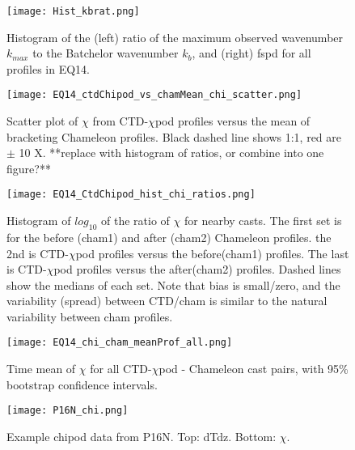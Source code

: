 \documentclass{ametsoc}
\begin{document}
\begin{figure}[t]
  \noindent\texttt{[image: Hist\_kbrat.png]}\\
  \caption{Histogram of the (left) ratio of the maximum observed wavenumber $k_{max}$ to the Batchelor wavenumber $k_b$, and (right) fspd for all profiles in EQ14. }
  \label{histkbrat}
\end{figure}

\begin{figure}[t]
  \noindent\texttt{[image: EQ14\_ctdChipod\_vs\_chamMean\_chi\_scatter.png]}\\
  \caption{Scatter plot of $\chi$ from CTD-$\chi$pod profiles versus the mean of bracketing Chameleon profiles. Black dashed line shows 1:1, red are $\pm$ 10 X. **replace with histogram of ratios, or combine into one figure?**}
  \label{eq14_cdtChi_vs_cham}
\end{figure}

\begin{figure}[t]
  \noindent\texttt{[image: EQ14\_CtdChipod\_hist\_chi\_ratios.png]}\\
  \caption{Histogram of $log_{10}$ of the ratio of $\chi$ for nearby casts. The first set is for the before (cham1) and after (cham2) Chameleon profiles. the 2nd is CTD-$\chi$pod profiles versus the before(cham1) profiles. The last is CTD-$\chi$pod profiles versus the after(cham2) profiles. Dashed lines show the medians of each set.  Note that bias is small/zero, and the variability (spread) between CTD/cham is similar to the natural variability between cham profiles.}
  \label{eq14_cdtChi_vs_cham_hist}
\end{figure}

\begin{figure}[t]
  \noindent\texttt{[image: EQ14\_chi\_cham\_meanProf\_all.png]}\\
  \caption{Time mean of $\chi$ for all CTD-$\chi$pod - Chameleon cast pairs, with 95\% bootstrap confidence intervals.}
  \label{ctd_cham_chi_boot_all}
\end{figure}

\begin{figure}[t]
 \noindent\texttt{[image: P16N\_chi.png]}\\
 \caption{Example chipod data from P16N. Top: dTdz. Bottom: $\chi$.}
 \label{p16ex}
\end{figure}
\end{document}
